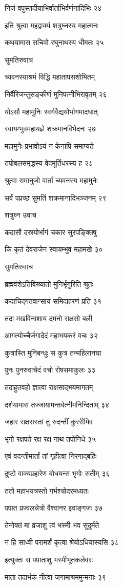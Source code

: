 निजं वपुस्तदीयाभिर्वार्ताभिर्वर्णनादिभिः २४

इति श्रुत्वा महद्वाक्यं शत्रुघ्नस्य महात्मनः

कथयामास सचिवो रघुनाथस्य धीमतः २५

सुमतिरुवाच

च्यवनस्याश्रमं विद्धि महातापसशोभितम्

निर्वैरिजन्तुसङ्कीर्णं मुनिपत्नीभिरावृतम् २६

योऽसौ महामुनिः स्वर्गवैद्ययोर्भागमादधात्

स्वायम्भुवमहायज्ञे शक्रमानविभेदनः २७

महामुनेः प्रभावोऽयं न केनापि समाप्यते

तपोबलसमृद्धस्य वेदमूर्तिधरस्य ह २८

श्रुत्वा रामानुजो वार्तां च्यवनस्य महामुनेः

सर्वं पप्रच्छ सुमतिं शक्रमानादिभञ्जनम् २९

शत्रुघ्न उवाच

कदासौ दस्रयोर्भागं चकार सुरपङ्क्तिषु

किं कृतं देवराजेन स्वायम्भुव महामखे ३०

सुमतिरुवाच

ब्रह्मवंशेऽतिविख्यातो मुनिर्भृगुरिति श्रुतः

कदाचिद्गतवान्सायं समिदाहरणं प्रति ३१

तदा मखविनाशाय दमनो राक्षसो बली

आगत्योच्चैर्जगादेदं महाभयकरं वचः ३२

कुत्रास्ति मुनिबन्धुः स कुत्र तन्महिलानघा

पुनः पुनरुवाचेदं वचो रोषसमाकुलः ३३

तदाहुतवहो ज्ञात्वा राक्षसाद्भयमागतम्

दर्शयामास तज्जायामन्तर्वत्नीमनिन्दिताम् ३४

जहार राक्षसस्तां तु रुदन्तीं कुररीमिव

भृगो रक्षपते रक्ष रक्ष नाथ तपोनिधे ३५

एवं वदन्तीमार्तां तां गृहीत्वा निरगाद्बहिः

दुष्टो वाक्यप्रहारेण बोधयन्स भृगोः सतीम् ३६

ततो महाभयत्रस्तो गर्भश्चोदरमध्यतः

पपात प्रज्वलन्नेत्रो वैश्वानर इवाङ्गजः ३७

तेनोक्तं मा व्रजाशु त्वं भस्मी भव सुदुर्मते

न हि साध्वी परामर्शं कृत्वा श्रेयोऽधियास्यसि ३८

इत्युक्तः स पपाताशु भस्मीभूतकलेवरः

माता तदार्भकं नीत्वा जगामाश्रममुन्मनाः ३९

